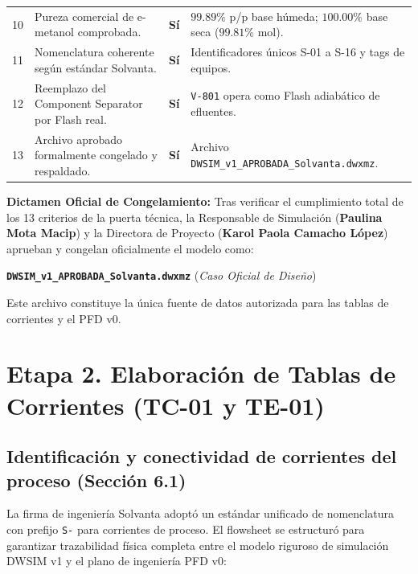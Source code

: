 \documentclass[11pt,letterpaper]{article}
\begin{document}
\begin{center}
\begin{tabularx}{\textwidth}{cp{7.2cm}cX}
10 & Pureza comercial de e-metanol comprobada. & \textbf{Sí} & $99.89\%$ p/p base húmeda; $100.00\%$ base seca ($99.81\%$ mol). \\
11 & Nomenclatura coherente según estándar Solvanta. & \textbf{Sí} & Identificadores únicos S-01 a S-16 y tags de equipos. \\
12 & Reemplazo del Component Separator por Flash real. & \textbf{Sí} & \texttt{V-801} opera como Flash adiabático de efluentes. \\
13 & Archivo aprobado formalmente congelado y respaldado. & \textbf{Sí} & Archivo \texttt{DWSIM\_v1\_APROBADA\_Solvanta.dwxmz}. \\
\bottomrule
\end{tabularx}
\end{center}

\vspace{0.4cm}
\begin{puertabox}
\textbf{Dictamen Oficial de Congelamiento:} Tras verificar el cumplimiento total de los 13 criterios de la puerta técnica, la Responsable de Simulación (\textbf{Paulina Mota Macip}) y la Directora de Proyecto (\textbf{Karol Paola Camacho López}) aprueban y congelan oficialmente el modelo como:
\begin{center}
\texttt{\textbf{DWSIM\_v1\_APROBADA\_Solvanta.dwxmz}} \quad (\textit{Caso Oficial de Diseño})
\end{center}
Este archivo constituye la única fuente de datos autorizada para las tablas de corrientes y el PFD v0.
\end{puertabox}

\clearpage

\section{Etapa 2. Elaboración de Tablas de Corrientes (TC-01 y TE-01)}

\subsection{Identificación y conectividad de corrientes del proceso (Sección 6.1)}

La firma de ingeniería Solvanta adoptó un estándar unificado de nomenclatura con prefijo \texttt{S-} para corrientes de proceso. El flowsheet se estructuró para garantizar trazabilidad física completa entre el modelo riguroso de simulación DWSIM v1 y el plano de ingeniería PFD v0:
\end{document}
